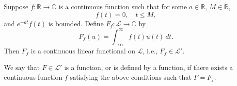 Suppose $f: \mathbb{R} \to \mathbb{C}$ is a continuous function such that for some $a \in \mathbb{R}$, $M \in \mathbb{R}$,
$$f(t) = 0, \quad t \leq M,$$
and $e^{-at}f(t)$ is bounded. Define $F_f: \mathcal{L} \to \mathbb{C}$ by
$$F_f(u) = \int_{-\infty}^{\infty} f(t) u(t) \, dt.$$
Then $F_f$ is a continuous linear functional on $\mathcal{L}$, i.e., $F_f \in \mathcal{L}'$.

We say that $F \in \mathcal{L}'$ is a function, or is defined by a function, if there exists a continuous function $f$ satisfying the above conditions such that $F = F_f$.
